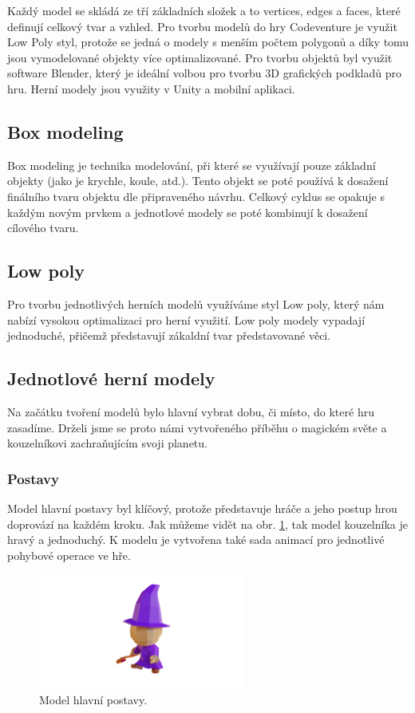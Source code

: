 Každý model se skládá ze tří základních složek a to vertices, edges a faces, které definují celkový tvar a vzhled. Pro tvorbu modelů do hry Codeventure je využit Low Poly styl, protože se jedná o modely s menším počtem polygonů a díky tomu jsou vymodelované objekty více optimalizované. Pro tvorbu objektů byl využit software Blender, který je ideální volbou pro tvorbu 3D grafických podkladů pro hru. Herní modely jsou využity v Unity a mobilní aplikaci.

\subsection{Box modeling}
Box modeling je technika modelování, při které se využívají pouze základní objekty (jako je krychle, koule, atd.). Tento objekt se poté používá k dosažení finálního tvaru objektu dle připraveného návrhu. Celkový cyklus se opakuje s každým novým prvkem a jednotlové modely se poté kombinují k dosažení cílového tvaru.

\subsection{Low poly}
Pro tvorbu jednotlivých herních modelů využíváme styl Low poly, který nám nabízí vysokou optimalizaci pro herní využití. Low poly modely vypadají jednoduché, přičemž představují zákaldní tvar představované věci.

\subsection{Jednotlové herní modely}
Na začátku tvoření modelů bylo hlavní vybrat dobu, či místo, do které hru zasadíme. Drželi jsme se proto námi vytvořeného příběhu o magickém světe a kouzelníkovi zachraňujícím svoji planetu.

\subsubsection{Postavy}
Model hlavní postavy byl klíčový, protože představuje hráče a jeho postup hrou doprovází na každém kroku. Jak můžeme vidět na obr. \ref{fig:hlavni-postava}, tak model kouzelníka je hravý a jednoduchý. K modelu je vytvořena také sada animací pro jednotlivé pohybové operace ve hře.

\begin{figure}[h]
    \centering
    \includegraphics[width=0.6\textwidth]{img/hlavni-postava.png}
    \caption{Model hlavní postavy.}
    \label{fig:hlavni-postava}
\end{figure}

